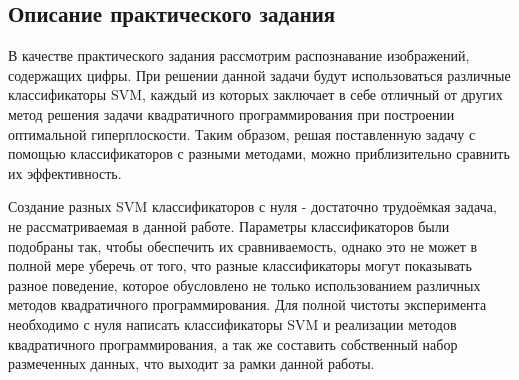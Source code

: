 
\subsection{Описание практического задания}
В качестве практического задания рассмотрим распознавание изображений, содержащих цифры. При решении данной задачи будут использоваться различные классификаторы SVM, каждый из которых заключает в себе отличный от других метод решения задачи квадратичного программирования при построении оптимальной гиперплоскости. Таким образом, решая поставленную задачу с помощью классификаторов с разными методами, можно приблизительно сравнить их эффективность. 

Создание разных SVM классификаторов с нуля - достаточно трудоёмкая задача, не рассматриваемая в данной работе. Параметры классификаторов были подобраны так, чтобы обеспечить их сравниваемость, однако это не может в полной мере уберечь от того, что разные классификаторы могут показывать разное поведение, которое обусловлено не только использованием различных методов квадратичного программирования. Для полной чистоты эксперимента необходимо с нуля написать классификаторы SVM и реализации методов квадратичного программирования, а так же составить собственный набор размеченных данных, что выходит за рамки данной работы.

